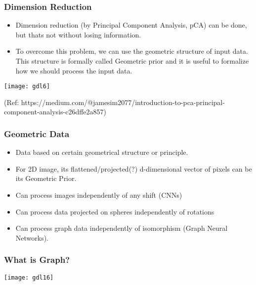 \begin{frame}[fragile]\frametitle{Dimension Reduction}

\begin{itemize}
\item Dimension reduction (by Principal Component Analysis, pCA) can be done, but thats not without losing information.
\item To overcome this problem, we can use the geometric structure of input data. This structure is formally called Geometric prior and it is useful to formalize how we should process the input data.
\end{itemize}
	  
\begin{center}
\texttt{[image: gdl6]}
\end{center}

{\tiny (Ref: https://medium.com/@jamesim2077/introduction-to-pca-principal-component-analysis-c26dffe2a857)}		
\end{frame}


\begin{frame}[fragile]\frametitle{Geometric Data}

\begin{itemize}
\item Data based on certain geometrical structure or principle. 
\item For 2D image, its flattened/projected(?) d-dimensional vector of pixels can be its Geometric Prior.
\item Can process images independently of any shift (CNNs)
\item Can process data projected on spheres independently of rotations
\item Can process graph data independently of isomorphism (Graph Neural Networks).
\end{itemize}
	
\end{frame}

\begin{frame}[fragile]\frametitle{What is Graph?}


	  
\begin{center}
\texttt{[image: gdl16]}
\end{center}

\end{frame}


